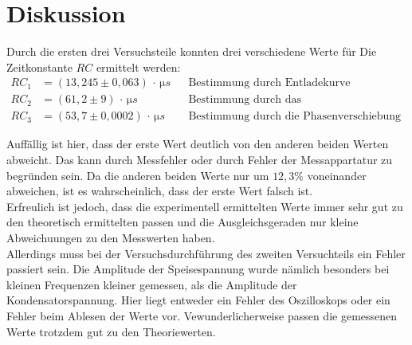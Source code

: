 \section{Diskussion}
\label{sec:Diskussion}

Durch die ersten drei Versuchsteile konnten drei verschiedene Werte für Die Zeitkonstante
$RC$ ermittelt werden: \\
\begin{align*}
    RC_1 &= (13{,}245 \pm 0{,}063) \, \cdot \, \si{\micro s} &
	     &\text{Bestimmung durch Entladekurve}
	\\
	RC_2 &= (61,2 \pm 9)  \, \cdot \, \si{\micro s} &
	     &\text{Bestimmung durch das Amplitudenverhältnis}
	\\
	RC_3 &= (53,7 \pm 0,0002) \, \cdot \, \si{\micro s} &
	     &\text{Bestimmung durch die Phasenverschiebung}
\end{align*}

Auffällig ist hier, dass der erste Wert deutlich von den anderen beiden Werten abweicht. Das kann durch Messfehler
oder durch Fehler der Messappartatur zu begründen sein. Da die anderen beiden Werte nur um $12,3 \%$ voneinander abweichen,
ist es wahrscheinlich, dass der erste Wert falsch ist.\\
Erfreulich ist jedoch, dass die experimentell ermittelten Werte immer sehr gut zu den theoretisch ermittelten 
passen und die Ausgleichsgeraden nur kleine Abweichuungen zu den Messwerten haben.\\
Allerdings muss bei der Versuchsdurchführung des zweiten Versuchteils ein Fehler passiert sein. Die Amplitude
der Speisespannung wurde nämlich besonders bei kleinen Frequenzen kleiner gemessen, als die Amplitude der 
Kondensatorspannung. Hier liegt entweder ein Fehler des Oszilloskops oder ein Fehler beim Ablesen der Werte vor.
Vewunderlicherweise passen die gemessenen Werte trotzdem gut zu den Theoriewerten.